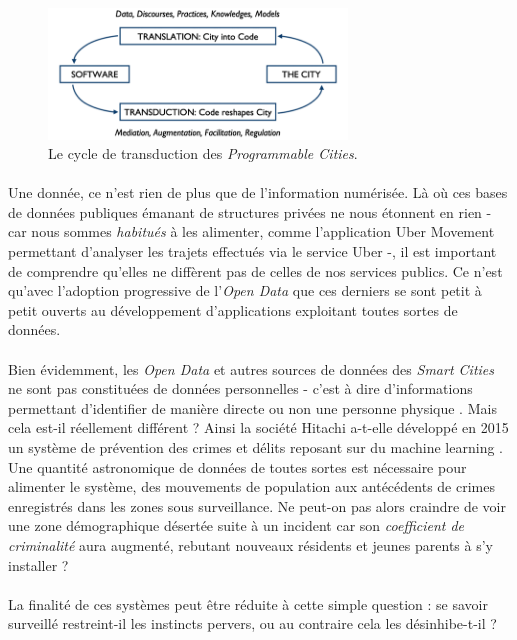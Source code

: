 \begin{figure}[ht]
    \centering
    \includegraphics[width=300px]{chapters/01/images/programmable_city.png}
    \caption{\label{programmable_city}Le cycle de transduction des \emph{Programmable Cities}.}
\end{figure}

\paragraph{} Une donnée, ce n'est rien de plus que de l'information numérisée. Là où ces bases de données publiques
émanant de structures privées ne nous étonnent en rien - car nous sommes \emph{habitués} à les alimenter, comme l'application
Uber Movement permettant d'analyser les trajets effectués via le service Uber -, il est important de comprendre
qu'elles ne diffèrent pas de celles de nos services publics. Ce n'est qu'avec l'adoption progressive de l'\emph{Open
Data} que ces derniers se sont petit à petit ouverts au développement d'applications exploitant toutes sortes de données. 

\paragraph{} Bien évidemment, les \emph{Open Data} et autres sources de données des \emph{Smart Cities} ne sont pas
constituées de données personnelles - c'est à dire d'informations permettant d'identifier de manière directe ou non une 
personne physique \cite{PersonalData0}. Mais cela est-il réellement différent ? Ainsi la société Hitachi a-t-elle développé
en 2015 un système de prévention des crimes et délits reposant sur du machine learning \cite{ProgrammableCity2}. Une quantité
astronomique de données de toutes sortes est nécessaire pour alimenter le système, des mouvements de population aux 
antécédents de crimes enregistrés dans les zones sous surveillance. Ne peut-on pas alors craindre de voir une zone 
démographique désertée suite à un incident car son \emph{coefficient de criminalité} aura augmenté, rebutant nouveaux
résidents et jeunes parents à s'y installer ?

\paragraph{} La finalité de ces systèmes peut être réduite à cette simple question : se savoir surveillé restreint-il
les instincts pervers, ou au contraire cela les désinhibe-t-il ?


